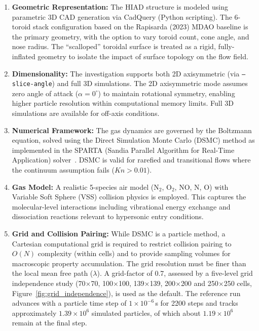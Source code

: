 \begin{enumerate}
    \item \textbf{Geometric Representation:} The HIAD structure is modeled using parametric 3D CAD generation via CadQuery (Python scripting). The 6-toroid stack configuration based on the Rapisarda (2023) MDAO baseline is the primary geometry, with the option to vary toroid count, cone angle, and nose radius. The ``scalloped'' toroidal surface is treated as a rigid, fully-inflated geometry to isolate the impact of surface topology on the flow field.

    \item \textbf{Dimensionality:} The investigation supports both 2D axisymmetric (via \texttt{--slice-angle}) and full 3D simulations. The 2D axisymmetric mode assumes zero angle of attack ($\alpha = 0^\circ$) to maintain rotational symmetry, enabling higher particle resolution within computational memory limits. Full 3D simulations are available for off-axis conditions.

    \item \textbf{Numerical Framework:} The gas dynamics are governed by the Boltzmann equation, solved using the Direct Simulation Monte Carlo (DSMC) method as implemented in the SPARTA (Sandia Parallel Algorithm for Real-Time Application) solver~\cite{plimpton2014sparta}. DSMC is valid for rarefied and transitional flows where the continuum assumption fails ($Kn > 0.01$).

    \item \textbf{Gas Model:} A realistic 5-species air model (N$_2$, O$_2$, NO, N, O) with Variable Soft Sphere (VSS) collision physics is employed. This captures the molecular-level interactions including vibrational energy exchange and dissociation reactions relevant to hypersonic entry conditions.

    \item \textbf{Grid and Collision Pairing:} While DSMC is a particle method, a Cartesian computational grid is required to restrict collision pairing to $O(N)$ complexity (within cells) and to provide sampling volumes for macroscopic property accumulation. The grid resolution must be finer than the local mean free path ($\lambda$). A grid-factor of 0.7, assessed by a five-level grid independence study (70$\times$70, 100$\times$100, 139$\times$139, 200$\times$200 and 250$\times$250 cells, Figure~\ref{fig:grid_independence}), is used as the default. The reference run advances with a particle time step of $1\times10^{-6}$\,s for 2200 steps and tracks approximately $1.39\times10^{6}$ simulated particles, of which about $1.19\times10^{6}$ remain at the final step.


\end{enumerate}
